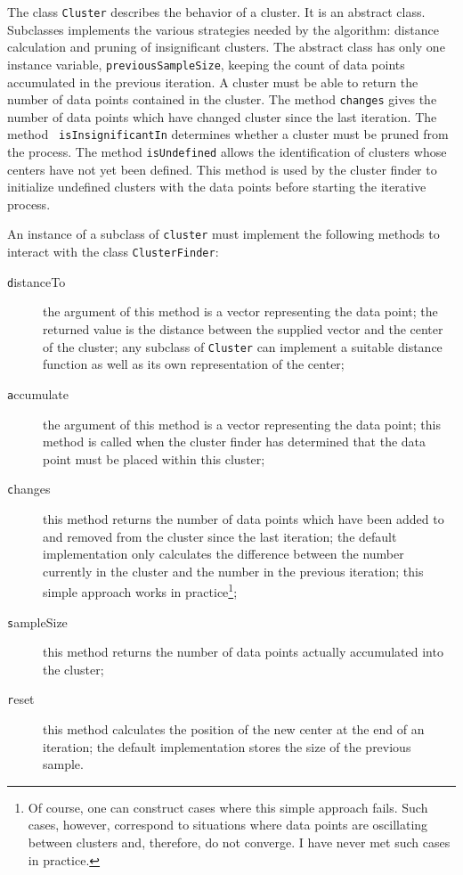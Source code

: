 The class \texttt{Cluster} describes the behavior of a cluster. It is
an abstract class. Subclasses implements the various strategies
needed by the algorithm: distance calculation and pruning of
insignificant clusters. The abstract class has only one instance
variable, \texttt{previousSampleSize}, keeping the count of data
points accumulated in the previous iteration. A cluster must be
able to return the number of data points contained in the cluster.
The method \texttt{changes} gives the number of data points which
have changed cluster since the last iteration. The method \texttt{
isInsignificantIn} determines whether a cluster must be pruned
from the process. The method \texttt{isUndefined} allows the
identification of clusters whose centers have not yet been
defined. This method is used by the cluster finder to initialize
undefined clusters with the data points before starting the
iterative process.

An instance of a subclass of \texttt{cluster} must implement the
following methods to interact with the class \texttt{ClusterFinder}:
\begin{description}
  \item[\texttt distanceTo] the argument of this method is a vector
  representing the data point; the returned value is the distance
  between the supplied vector and the center of the cluster; any
  subclass of \texttt{Cluster} can implement a suitable distance function
  as well as its own representation of the center;
  \item[\texttt accumulate] the argument of this method is a vector
  representing the data point; this method is called when the
  cluster finder has determined that the data point must be placed
  within this cluster;
  \item[\texttt changes] this method returns the number of data points
  which have been added to and removed from the cluster since the
  last iteration; the default implementation only calculates the
  difference between the number currently in the cluster and the
  number in the previous iteration; this simple approach works in
  practice\footnote{Of course, one can construct cases where this
  simple approach fails. Such cases, however, correspond to
  situations where data points are oscillating between clusters
  and, therefore, do not converge. I have never met such cases in practice.};
  \item[\texttt sampleSize] this method returns the number of data
  points actually accumulated into the cluster;
  \item[\texttt reset] this method calculates the position of the new
  center at the end of an iteration; the default implementation
  stores the size of the previous sample.
\end{description}

